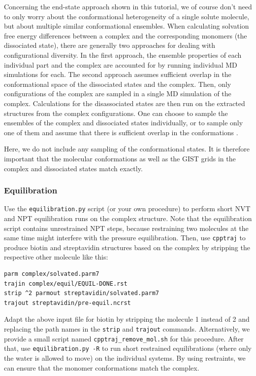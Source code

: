 \documentclass[9pt,tutorial]{livecoms}
\newcommand{\software}{\texttt}
\newcommand\inlinecode{\texttt}
\begin{document}
Concerning the end-state approach shown in this tutorial, we of course don't need to only worry about the conformational heterogeneity of a single solute molecule, but about multiple similar conformational ensembles.
When calculating solvation free energy differences between a complex and the corresponding monomers (the dissociated state), there are generally two approaches for dealing with configurational diversity. 
In the first approach, the ensemble properties of each individual part and the complex are accounted for by running individual MD simulations for each.
The second approach assumes sufficient overlap in the conformational space of the dissociated states and the complex. 
Then, only configurations of the complex are sampled in a single MD simulation of the complex. 
Calculations for the disassociated states are then run on the extracted structures from the complex configurations.
One can choose to sample the ensembles of the complex and dissociated states individually, or to sample only one of them and assume that there is sufficient overlap in the conformations \cite{Genheden-EndState2012,Wang-MMPBSA2019}. 

Here, we do not include any sampling of the conformational states.
It is therefore important that the molecular conformations as well as the GIST grids in the complex and dissociated states match exactly.
\subsubsection{Equilibration}
Use the \software{equilibration.py} script (or your own procedure) to perform short NVT and NPT equilibration runs on the complex structure.
Note that the equilibration script contains unrestrained NPT steps, because restraining two molecules at the same time might interfere with the pressure equilibration.
Then, use \software{cpptraj} to produce biotin and streptavidin structures based on the complex by stripping the respective other molecule like this:
\begin{lstlisting}[style=cpptraj]
parm complex/solvated.parm7
trajin complex/equil/EQUIL-DONE.rst
strip ^2 parmout streptavidin/solvated.parm7
trajout streptavidin/pre-equil.ncrst
\end{lstlisting}
Adapt the above input file for biotin by stripping the molecule 1 instead of 2 and replacing the path names in the \inlinecode{strip} and  \inlinecode{trajout} commands.
Alternatively, we provide a small script named \software{cpptraj\_remove\_mol.sh} for this procedure.
After that, use \software{equilibration.py -R} to run short restrained 
equilibrations (where only the water is allowed to move) on the individual 
systems.
By using restraints, we can ensure that the monomer conformations match the complex.
\end{document}
